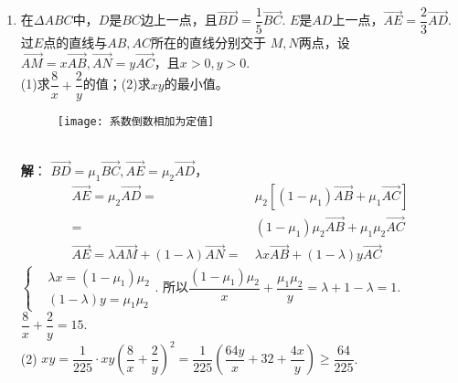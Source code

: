 \begin{enumerate}[leftmargin=\inteval{\myenumleftmargin}pt]
\item 在$ \Delta ABC $中，$ D $是$ BC $边上一点，且$ \vec{BD}=
\dfrac{1}{5}\vec{BC} $. $ E $是$ AD $上一点，$ \vec{AE} =
\dfrac{2}{3}\vec{AD} $. 过$ E $点的直线与$ AB,AC $所在的直线分别交于
$ M,N $两点，设$ \vec{AM}=x\vec{AB},\vec{AN}=
y\vec{AC} $，且$ x>0,y>0 $. \\
(1)求$ \dfrac{8}{x}+\dfrac{2}{y} $的值；(2)求$ xy $的最小值。
\begin{figure}[!htbp]
    \centering
    \texttt{[image: 系数倒数相加为定值]}
\end{figure} 
\ifteach \\ \textbf{解}：
$ \vec{BD}=\mu_1\vec{BC}, \vec{AE} =
\mu_2\vec{AD} $，
\begin{align*}
    \vec{AE} =\mu_2\vec{AD} =&\ \mu_2\left[
    (1-\mu_1)\vec{AB}+\mu_1\vec{AC}\right]\\
    =&\ (1-\mu_1)\mu_2\vec{AB}+\mu_1\mu_2\vec{AC} \\
    \vec{AE}=\lambda\vec{AM}+(1-\lambda)
    \vec{AN}=&\ \lambda x\vec{AB}+(1-\lambda)y
    \vec{AC}
\end{align*}
$ \left\{ 
\begin{aligned}
    &\lambda x = (1-\mu_1)\mu_2 \\
    &(1-\lambda)y = \mu_1\mu_2
\end{aligned} \right. $. 所以$ \dfrac{(1-\mu_1)\mu_2}{x}+\dfrac{\mu_1\mu_2}{y}
=\lambda+1-\lambda=1 $.  \quad $ \dfrac{8}{x}+\dfrac{2}{y}=15 $. \\
(2) $ xy=\dfrac{1}{225}\cdot xy \left(\dfrac{8}{x}+\dfrac{2}{y}\right)^2=
\dfrac{1}{225}\left(\dfrac{64y}{x}+32+\dfrac{4x}{y}\right)\geq\dfrac{64}{225} $. 
\fi

%
%
%
%
%
%
%
%
%
%
%
%

\end{enumerate}
\myfootnote{\CopyrightStatementChap}
\cleardoublepage





